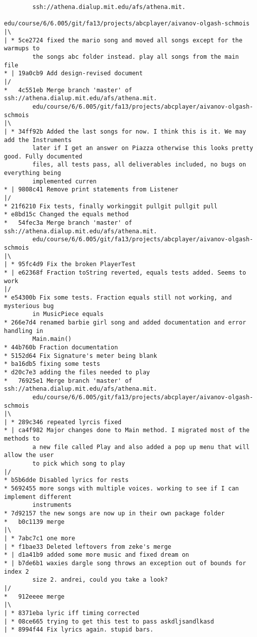 \documentclass[12pt]{book}
\begin{document}
\begin{Verbatim}
        ssh://athena.dialup.mit.edu/afs/athena.mit.
                edu/course/6/6.005/git/fa13/projects/abcplayer/aivanov-olgash-schmois
|\
| * 5ce2724 fixed the mario song and moved all songs except for the warmups to 
        the songs abc folder instead. play all songs from the main file
* | 19a0cb9 Add design-revised document
|/
*   4c551eb Merge branch 'master' of ssh://athena.dialup.mit.edu/afs/athena.mit.
        edu/course/6/6.005/git/fa13/projects/abcplayer/aivanov-olgash-schmois
|\
| * 34ff92b Added the last songs for now. I think this is it. We may add the Instruments 
        later if I get an answer on Piazza otherwise this looks pretty good. Fully documented 
        files, all tests pass, all deliverables included, no bugs on everything being 
        implemented curren
* | 9808c41 Remove print statements from Listener
|/
* 21f6210 Fix tests, finally workinggit pullgit pullgit pull
* e8bd15c Changed the equals method
*   54fec3a Merge branch 'master' of ssh://athena.dialup.mit.edu/afs/athena.mit.
        edu/course/6/6.005/git/fa13/projects/abcplayer/aivanov-olgash-schmois
|\
| * 95fc4d9 Fix the broken PlayerTest
* | e62368f Fraction toString reverted, equals tests added. Seems to work
|/
* e54300b Fix some tests. Fraction equals still not working, and mysterious bug 
        in MusicPiece equals
* 266e7d4 renamed barbie girl song and added documentation and error handling in 
        Main.main()
* 44b760b Fraction documentation
* 5152d64 Fix Signature's meter being blank
* ba16db5 fixing some tests
* d20c7e3 adding the files needed to play
*   76925e1 Merge branch 'master' of ssh://athena.dialup.mit.edu/afs/athena.mit.
        edu/course/6/6.005/git/fa13/projects/abcplayer/aivanov-olgash-schmois
|\
| * 289c346 repeated lyrcis fixed
* | ca4f982 Major changes done to Main method. I migrated most of the methods to 
        a new file called Play and also added a pop up menu that will allow the user 
        to pick which song to play
|/
* b5b6dde Disabled lyrics for rests
* 5692455 more songs with multiple voices. working to see if I can implement different 
        instruments
* 7d92157 the new songs are now up in their own package folder
*   b0c1139 merge
|\
| * 7abc7c1 one more
| * f1bae33 Deleted leftovers from zeke's merge
* | d1a41b9 added some more music and fixed dream on
* | b7de6b1 waxies dargle song throws an exception out of bounds for index 2 
        size 2. andrei, could you take a look?
|/
*   912eeee merge
|\
| * 8371eba lyric iff timing corrected
| * 08ce665 trying to get this test to pass askdljsandlkasd
| * 8994f44 Fix lyrics again. stupid bars.

\end{Verbatim}
\end{document}
